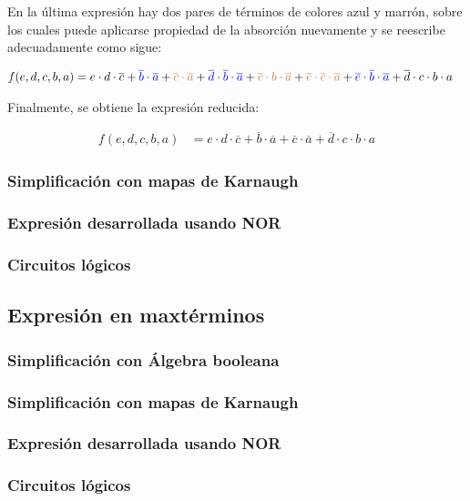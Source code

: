 En la \'ultima expresi\'on hay dos pares de t\'erminos de colores azul y marr\'on, sobre los cuales
puede aplicarse propiedad de la absorci\'on nuevamente y se reescribe adecuadamente como sigue:

\begin{equation*}
\begin{align*}
f(e,d,c,b,a) & = {e \cdot d \cdot \overline{c}}
+ {\color{blue} \overline{b} \cdot \overline{a}}
+ {\color{brown} \overline{c} \cdot \overline{a}}
+ {\color{blue} \overline{d} \cdot \overline{b} \cdot \overline{a}}
+ {\color{brown} \overline{c} \cdot b \cdot \overline{a}}
+ {\color{brown} \overline{e} \cdot \overline{c} \cdot \overline{a}}
+ {\color{blue} \overline{e} \cdot \overline{b} \cdot \overline{a}}
+ {\overline{d} \cdot c \cdot b \cdot a}
\end{align*}
\end{equation*}

Finalmente, se obtiene la expresi\'on reducida:

\begin{equation*}
\begin{align*}
f(e,d,c,b,a) & = {e \cdot d \cdot \overline{c}}
+ {\overline{b} \cdot \overline{a}}
+ {\overline{c} \cdot \overline{a}}
+ {\overline{d} \cdot c \cdot b \cdot a}
\end{align*}
\end{equation*}


\subsubsection{Simplificación con mapas de Karnaugh}

\subsubsection{Expresión desarrollada usando NOR}

\subsubsection{Circuitos lógicos}

\subsection{Expresi\'on en maxt\'erminos}

\subsubsection{Simplificación con Álgebra booleana}

\subsubsection{Simplificación con mapas de Karnaugh}

\subsubsection{Expresión desarrollada usando NOR}

\subsubsection{Circuitos lógicos}
